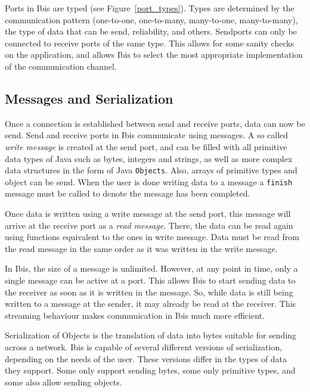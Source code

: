 \documentclass[10pt]{article}
\begin{document}
Ports in Ibis are typed (see Figure~\ref{port_types}). Types are
determined by the communication pattern (one-to-one, one-to-many,
many-to-one, many-to-many), the type of data that can be send,
reliability, and others. Sendports can only be connected to receive
ports of the same type. This allows for some sanity checks on the
application, and allows Ibis to select the most appropriate
implementation of the communication channel.

\subsection{Messages and Serialization}


Once a connection is established between send and receive ports, data
can now be send. Send and receive ports in Ibis communicate using
messages. A so called \emph{write message} is created at the send port,
and can be filled with all primitive data types of Java such as bytes, integers
and strings, as well as more complex data structures in the form of
Java \texttt{Objects}. Also, arrays of primitive types and object can be
send. When the user is done writing data to a message a \texttt{finish}
message must be called to denote the message has been completed.

Once data is written using a write message at the send port, this
message will arrive at the receive port as a \emph{read message}. There,
the data can be read again using functions equivalent to the ones in
write message. Data must be read from the read message in the same order
as it was written in the write message.

In Ibis, the size of a message is unlimited. However, at any point in
time, only a single message can be active at a port. This allows Ibis to
start sending data to the receiver as soon as it is written in the
message. So, while data is still being written to a message at the
sender, it may already be read at the receiver. This streaming behaviour
makes communication in Ibis much more efficient.

Serialization of Objects is the translation of data into bytes suitable for
sending across a network. Ibis is capable of several different versions
of serialization, depending on the needs of the user. These versions
differ in the types of data they support. Some only support sending
bytes, some only primitive types, and some also allow sending objects.
\end{document}
